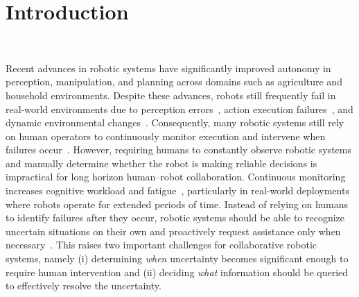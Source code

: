 \section{Introduction}~\label{intro}

Recent advances in robotic systems have significantly improved autonomy in perception, manipulation, and planning across domains such as agriculture and household environments. Despite these advances, robots still frequently fail in real-world environments due to perception errors~\cite{kaipa2016addressing}, action execution failures~\cite{kaelbling1998planning}, and dynamic environmental changes~\cite{kurniawati2016online}. Consequently, many robotic systems still rely on human operators to continuously monitor execution and intervene when failures occur~\cite{dragan2013legibility, goodrich2008human}. However, requiring humans to constantly observe robotic systems and manually determine whether the robot is making reliable decisions is impractical for long horizon human--robot collaboration. Continuous monitoring increases cognitive workload and fatigue~\cite{chen2014human}, particularly in real-world deployments where robots operate for extended periods of time. Instead of relying on humans to identify failures after they occur, robotic systems should be able to recognize uncertain situations on their own and proactively request assistance only when necessary~\cite{sadigh2017active, leusmann2023understanding}. This raises two important challenges for collaborative robotic systems, namely (i) determining \textit{when} uncertainty becomes significant enough to require human intervention and (ii) deciding \textit{what} information should be queried to effectively resolve the uncertainty.





